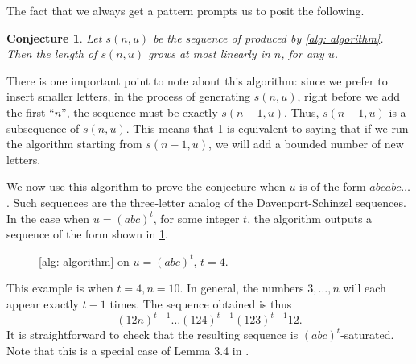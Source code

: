 \documentclass[12pt]{amsart}
\newtheorem{conj}{Conjecture}
\theoremstyle{definition}
\numberwithin{equation}{section}
\numberwithin{table}{thm}
\begin{document}
The fact that we always get a pattern prompts us to posit the following.
\begin{conj}\label{conj: algorithm}
    Let $s(n,u)$ be the sequence of produced by \cref{alg: algorithm}. Then the length of $s(n,u)$ grows at most linearly in $n$, for any $u$.
\end{conj}
There is one important point to note about this algorithm: since we prefer to insert smaller letters, in the process of generating $s(n,u)$, right before we add the first ``$n$'', the sequence must be exactly $s(n-1,u)$. Thus, $s(n-1,u)$ is a subsequence of $s(n,u)$. This means that \cref{conj: algorithm} is equivalent to saying that if we run the algorithm starting from $s(n-1,u)$, we will add a bounded number of new letters.

We now use this algorithm to prove the conjecture when $u$ is of the form $abcabc\dots$. Such sequences are the three-letter analog of the Davenport-Schinzel sequences. In the case when $u = (abc)^t$, for some integer $t$, the algorithm outputs a sequence of the form shown in \cref{fig: (abc)^t}.
\begin{figure}[ht]
\centering
{}
\caption{\cref{alg: algorithm} on $u=(abc)^t$, $t=4$.}\label{fig: (abc)^t}
\end{figure}
This example is when $t=4,n=10$. In general, the numbers $3,\dots, n$ will each appear exactly $t-1$ times. The sequence obtained is thus
\[(12n)^{t-1}\dots (124)^{t-1}(123)^{t-1}12.\]
It is straightforward to check that the resulting sequence is $(abc)^t$-saturated. Note that this is a special case of Lemma 3.4 in \cite{ANAND2025382}.
\end{document}
